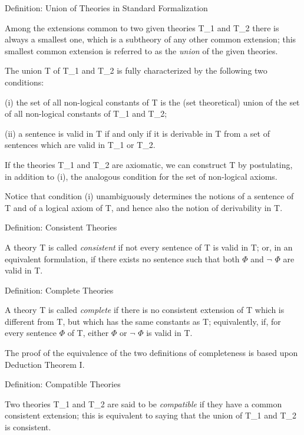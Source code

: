 \protect\hypertarget{anchor-34}{}{}Definition: Union of Theories in
Standard Formalization

Among the extensions common to two given theories T\_1 and T\_2 there is
always a smallest one, which is a subtheory of any other common
extension; this smallest common extension is referred to as the
\emph{union} of the given theories.

The union T of T\_1 and T\_2 is fully characterized by the following two
conditions:

(i) the set of all non-logical constants of T is the (set theoretical)
union of the set of all non-logical constants of T\_1 and T\_2;

(ii) a sentence is valid in T if and only if it is derivable in T from a
set of sentences which are valid in T\_1 or T\_2.

If the theories T\_1 and T\_2 are axiomatic, we can construct T by
postulating, in addition to (i), the analogous condition for the set of
non-logical axioms.

Notice that condition (i) unambiguously determines the notions of a
sentence of T and of a logical axiom of T, and hence also the notion of
derivability in T.

\protect\hypertarget{anchor-35}{}{}Definition: Consistent Theories

A theory T is called \emph{consistent} if not every sentence of T is
valid in T; or, in an equivalent formulation, if there exists no
sentence such that both $\Phi$  and $\neg$ $\Phi$  are valid in T.

\protect\hypertarget{anchor-36}{}{}Definition: Complete Theories

A theory T is called \emph{complete} if there is no consistent extension
of T which is different from T, but which has the same constants as T;
equivalently, if, for every sentence $\Phi$  of T, either $\Phi$  or $\neg$ $\Phi$  is valid in
T.

The proof of the equivalence of the two definitions of completeness is
based upon Deduction Theorem I.

\protect\hypertarget{anchor-37}{}{}Definition: Compatible Theories

Two theories T\_1 and T\_2 are said to be \emph{compatible} if they have
a common consistent extension; this is equivalent to saying that the
union of T\_1 and T\_2 is consistent.